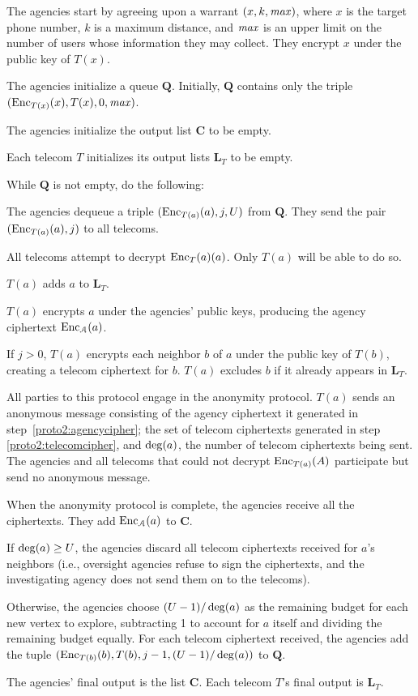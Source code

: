 \bce
\item The agencies start by agreeing upon a warrant $(x, k, \mathit{max})$, where $x$ is the target phone number, $k$ is a maximum distance, and $\mathit{max}$ is an upper limit on the number of users whose information they may collect. They encrypt $x$ under the public key of $T(x)$.
\item The agencies initialize a queue $\mathbf{Q}$. Initially, $\mathbf{Q}$ contains only the triple $(\operatorname{Enc}_{T(x)}(x), T(x), 0, \mathit{max})$.
\item The agencies initialize the output list $\mathbf{C}$ to be empty.
\item Each telecom $T$ initializes its output lists $\mathbf{L}_T$ to be empty.
\item While $\mathbf{Q}$ is not empty, do the following:
\bce
\item \label{proto2:dequeue} The agencies dequeue a triple $(\operatorname{Enc}_{T(a)}(a), j, U)$ from $\mathbf{Q}$. They send the pair $(\operatorname{Enc}_{T(a)}(a), j)$ to all telecoms.
\item All telecoms attempt to decrypt $\operatorname{Enc}_T(a)(a)$. Only $T(a)$ will be able to do so.
\item $T(a)$ adds $a$ to $\mathbf{L}_T$.
\item \label{proto2:agencycipher} $T(a)$ encrypts $a$ under the agencies' public keys, producing the agency ciphertext $\operatorname{Enc}_\mathcal{A}(a)$.
\item \label{proto2:telecomcipher} If $j>0$, $T(a)$ encrypts each neighbor $b$ of $a$ under the public key of $T(b)$, creating a telecom ciphertext for $b$. $T(a)$ excludes $b$ if it already appears in $\mathbf{L}_T$.
\item \label{proto2:anon} All parties to this protocol engage in the anonymity protocol. $T(a)$ sends an anonymous message consisting of the agency ciphertext it generated in step~\ref{proto2:agencycipher}; the set of telecom ciphertexts generated in step \ref{proto2:telecomcipher}, and $\operatorname{deg}(a)$, the number of telecom ciphertexts being sent. The agencies and all telecoms that could not decrypt $\operatorname{Enc}_{T(a)}(A)$ participate but send no anonymous message.
\item When the anonymity protocol is complete, the agencies receive all the ciphertexts. They add $\operatorname{Enc}_\mathcal{A}(a)$ to $\mathbf{C}$.
\item If $\operatorname{deg}(a)\geq U$, the agencies discard all telecom ciphertexts received for $a$'s neighbors (i.e., oversight agencies refuse to sign the ciphertexts, and the investigating agency does not send them on to the telecoms).
\item Otherwise, the agencies choose $(U-1)/\operatorname{deg}(a)$ as the remaining budget for each new vertex to explore, subtracting 1 to account for $a$ itself and dividing the remaining budget equally. For each telecom ciphertext received, the agencies add the tuple $(\operatorname{Enc}_{T(b)}(b), T(b), j-1, (U-1)/\operatorname{deg}(a))$ to $\mathbf{Q}$.
\ece
\item The agencies' final output is the list $\mathbf{C}$. Each telecom $T$'s final output is $\mathbf{L}_T$.
\ece

